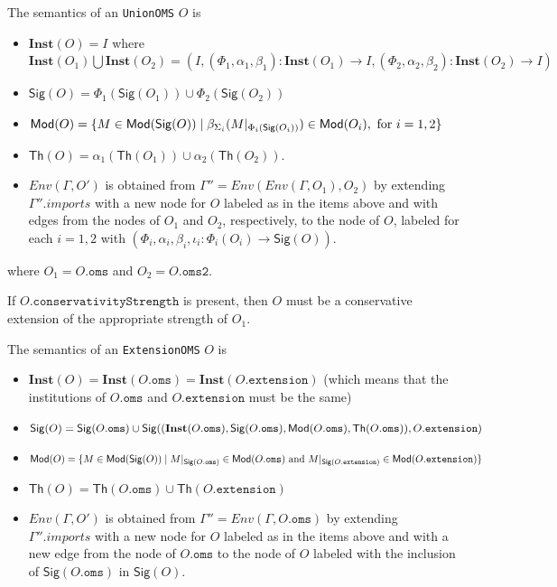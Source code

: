 \documentclass[10pt,fleqn,final]{scrreprt}
\newcommand*{\syntax}[1]{\texttt{#1}}
\newcommand{\Sig}{\mathsf{Sig}}
\renewcommand{\Th}{\mathsf{Th}}
\newcommand{\Inst}{\ensuremath{\mathbf{Inst}}}
\newenvironment{definitions}[0]{\medskip }{}
\begin{document}
\begin{definitions}

The semantics of an \syntax{UnionOMS} $O$ is
\begin{itemize}
  \item $\Inst(O) = I$ where
    $\Inst(O_1) \bigcup \Inst(O_2) =(I, (\Phi_1, \alpha_1,\beta_1) : \Inst(O_1) \rightarrow I, 
                    (\Phi_2, \alpha_2,\beta_2) : \Inst(O_2) \rightarrow I)$
  \item $\Sig(O) = \Phi_1(\Sig(O_1)) \cup \Phi_2(\Sig(O_2))$
  \item $\Mod(O) = \{ M\in \Mod(\Sig(O)) \mid \beta_{\Sigma_i}(M\forget{\Phi_i(\Sig(O_i))}) \in \Mod(O_i), \text{ for } i=1,2 \}$
  \item $\Th(O) = \alpha_1(\Th(O_1)) \cup \alpha_2(\Th(O_2))$.
    \item 
        $Env(\Gamma, O')$ is obtained from 
       $\Gamma'' = Env(Env(\Gamma,O_1), O_2)$
       by extending $\Gamma''.imports$
       with a new node for $O$ labeled as in the items above and
       with edges from the nodes of $O_1$ and $O_2$,
       respectively, to the node of $O$,
        labeled for each $i=1,2$ with
        $(\Phi_i, \alpha_i,\beta_i, \iota_i: \Phi_i(O_i) \to \Sig(O))$.
\end{itemize}
where $O_1 = O.\syntax{oms}$ and $O_2 = O.\syntax{oms2}$. 

If $O.\syntax{conservativityStrength}$ is present, then $O$ must be a conservative extension
of the appropriate strength of $O_1$.


The semantics of an \syntax{ExtensionOMS} $O$ is
\begin{itemize}
  \item $\Inst(O) = \Inst(O.\syntax{oms}) = \Inst(O.\syntax{extension})$ 
  (which means that
  the institutions of $O.\syntax{oms}$ and 
  $O.\syntax{extension}$ must be the same)
  \item $\Sig(O) = \Sig(O.\syntax{oms}) \cup 
  \Sig((\Inst(O.\syntax{oms}), \Sig(O.\syntax{oms}), \Mod(O.\syntax{oms}), \Th(O.\syntax{oms})),
  O.\syntax{extension})$
  \item $\Mod(O) = \{ M\in \Mod(\Sig(O)) \mid M\forget{\Sig(O.\syntax{oms})} \in \Mod(O.\syntax{oms})
  \text{ and }
  M \forget{\Sig(O.\syntax{extension})} \in \Mod(O.\syntax{extension})\}$
  \item $\Th(O) = \Th(O.\syntax{oms}) \cup \Th(O.\syntax{extension})$
  \item $Env(\Gamma, O')$ is obtained from 
       $\Gamma'' = Env(\Gamma, O.\syntax{oms})$
       by extending $\Gamma''.imports$
       with a new node for $O$ labeled as in the items above and
       with a new edge from the node of $O.\syntax{oms}$ to the node of $O$
        labeled with the inclusion of $\Sig(O.\syntax{oms})$ in 
        $\Sig(O)$.
\end{itemize}


\end{definitions}
\end{document}

